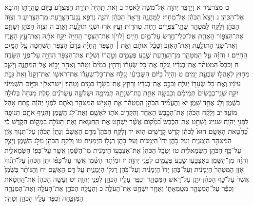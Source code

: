 \documentclass[twoside, openany, parskip=half, 11pt]{book}
\begin{document}
ט מצֹרעיד א וַיְדַבֵּ֥ר יְהֹוָ֖ה אֶל־מֹשֶׁ֥ה לֵּאמֹֽר׃ ב זֹ֤את תִּֽהְיֶה֙ תּוֹרַ֣ת הַמְּצֹרָ֔ע בְּי֖וֹם טׇהֳרָת֑וֹ וְהוּבָ֖א אֶל־הַכֹּהֵֽן׃ ג וְיָצָא֙ הַכֹּהֵ֔ן אֶל־מִח֖וּץ לַֽמַּחֲנֶ֑ה וְרָאָה֙ הַכֹּהֵ֔ן וְהִנֵּ֛ה נִרְפָּ֥א נֶֽגַע־הַצָּרַ֖עַת מִן־הַצָּרֽוּעַ׃ ד וְצִוָּה֙ הַכֹּהֵ֔ן וְלָקַ֧ח לַמִּטַּהֵ֛ר שְׁתֵּֽי־צִפֳּרִ֥ים חַיּ֖וֹת טְהֹר֑וֹת וְעֵ֣ץ אֶ֔רֶז וּשְׁנִ֥י תוֹלַ֖עַת וְאֵזֹֽב׃ ה וְצִוָּה֙ הַכֹּהֵ֔ן וְשָׁחַ֖ט אֶת־הַצִּפּ֣וֹר הָאֶחָ֑ת אֶל־כְּלִי־חֶ֖רֶשׂ עַל־מַ֥יִם חַיִּֽים׃ [לוי]ו אֶת־הַצִּפֹּ֤ר הַֽחַיָּה֙ יִקַּ֣ח אֹתָ֔הּ וְאֶת־עֵ֥ץ הָאֶ֛רֶז וְאֶת־שְׁנִ֥י הַתּוֹלַ֖עַת וְאֶת־הָאֵזֹ֑ב וְטָבַ֨ל אוֹתָ֜ם וְאֵ֣ת ׀ הַצִּפֹּ֣ר הַֽחַיָּ֗ה בְּדַם֙ הַצִּפֹּ֣ר הַשְּׁחֻטָ֔ה עַ֖ל הַמַּ֥יִם הַֽחַיִּֽים׃ ז וְהִזָּ֗ה עַ֧ל הַמִּטַּהֵ֛ר מִן־הַצָּרַ֖עַת שֶׁ֣בַע פְּעָמִ֑ים וְטִ֣הֲר֔וֹ וְשִׁלַּ֛ח אֶת־הַצִּפֹּ֥ר הַֽחַיָּ֖ה עַל־פְּנֵ֥י הַשָּׂדֶֽה׃ ח וְכִבֶּס֩ הַמִּטַּהֵ֨ר אֶת־בְּגָדָ֜יו וְגִלַּ֣ח אֶת־כׇּל־שְׂעָר֗וֹ וְרָחַ֤ץ בַּמַּ֙יִם֙ וְטָהֵ֔ר וְאַחַ֖ר יָב֣וֹא אֶל־הַֽמַּחֲנֶ֑ה וְיָשַׁ֛ב מִח֥וּץ לְאׇהֳל֖וֹ שִׁבְעַ֥ת יָמִֽים׃ ט וְהָיָה֩ בַיּ֨וֹם הַשְּׁבִיעִ֜י יְגַלַּ֣ח אֶת־כׇּל־שְׂעָר֗וֹ אֶת־רֹאשׁ֤וֹ וְאֶת־זְקָנוֹ֙ וְאֵת֙ גַּבֹּ֣ת עֵינָ֔יו וְאֶת־כָּל־שְׂעָר֖וֹ יְגַלֵּ֑חַ וְכִבֶּ֣ס אֶת־בְּגָדָ֗יו וְרָחַ֧ץ אֶת־בְּשָׂר֛וֹ בַּמַּ֖יִם וְטָהֵֽר׃ [ישראל]י וּבַיּ֣וֹם הַשְּׁמִינִ֗י יִקַּ֤ח שְׁנֵֽי־כְבָשִׂים֙ תְּמִימִ֔ם וְכַבְשָׂ֥ה אַחַ֛ת בַּת־שְׁנָתָ֖הּ תְּמִימָ֑ה וּשְׁלֹשָׁ֣ה עֶשְׂרֹנִ֗ים סֹ֤לֶת מִנְחָה֙ בְּלוּלָ֣ה בַשֶּׁ֔מֶן וְלֹ֥ג אֶחָ֖ד שָֽׁמֶן׃ יא וְהֶעֱמִ֞יד הַכֹּהֵ֣ן הַֽמְטַהֵ֗ר אֵ֛ת הָאִ֥ישׁ הַמִּטַּהֵ֖ר וְאֹתָ֑ם לִפְנֵ֣י יְהֹוָ֔ה פֶּ֖תַח אֹ֥הֶל מוֹעֵֽד׃ יב וְלָקַ֨ח הַכֹּהֵ֜ן אֶת־הַכֶּ֣בֶשׂ הָאֶחָ֗ד וְהִקְרִ֥יב אֹת֛וֹ לְאָשָׁ֖ם וְאֶת־לֹ֣ג הַשָּׁ֑מֶן וְהֵנִ֥יף אֹתָ֛ם תְּנוּפָ֖ה לִפְנֵ֥י יְהֹוָֽה׃ שנייג וְשָׁחַ֣ט אֶת־הַכֶּ֗בֶשׂ בִּ֠מְק֠וֹם אֲשֶׁ֨ר יִשְׁחַ֧ט אֶת־הַֽחַטָּ֛את וְאֶת־הָעֹלָ֖ה בִּמְק֣וֹם הַקֹּ֑דֶשׁ כִּ֡י כַּ֠חַטָּ֠את הָאָשָׁ֥ם הוּא֙ לַכֹּהֵ֔ן קֹ֥דֶשׁ קׇֽדָשִׁ֖ים הֽוּא׃ יד וְלָקַ֣ח הַכֹּהֵן֮ מִדַּ֣ם הָאָשָׁם֒ וְנָתַן֙ הַכֹּהֵ֔ן עַל־תְּנ֛וּךְ אֹ֥זֶן הַמִּטַּהֵ֖ר הַיְמָנִ֑ית וְעַל־בֹּ֤הֶן יָדוֹ֙ הַיְמָנִ֔ית וְעַל־בֹּ֥הֶן רַגְל֖וֹ הַיְמָנִֽית׃ טו וְלָקַ֥ח הַכֹּהֵ֖ן מִלֹּ֣ג הַשָּׁ֑מֶן וְיָצַ֛ק עַל־כַּ֥ף הַכֹּהֵ֖ן הַשְּׂמָאלִֽית׃ טז וְטָבַ֤ל הַכֹּהֵן֙ אֶת־אֶצְבָּע֣וֹ הַיְמָנִ֔ית מִן־הַשֶּׁ֕מֶן אֲשֶׁ֥ר עַל־כַּפּ֖וֹ הַשְּׂמָאלִ֑ית וְהִזָּ֨ה מִן־הַשֶּׁ֧מֶן בְּאֶצְבָּע֛וֹ שֶׁ֥בַע פְּעָמִ֖ים לִפְנֵ֥י יְהֹוָֽה׃ יז וּמִיֶּ֨תֶר הַשֶּׁ֜מֶן אֲשֶׁ֣ר עַל־כַּפּ֗וֹ יִתֵּ֤ן הַכֹּהֵן֙ עַל־תְּנ֞וּךְ אֹ֤זֶן הַמִּטַּהֵר֙ הַיְמָנִ֔ית וְעַל־בֹּ֤הֶן יָדוֹ֙ הַיְמָנִ֔ית וְעַל־בֹּ֥הֶן רַגְל֖וֹ הַיְמָנִ֑ית עַ֖ל דַּ֥ם הָאָשָֽׁם׃ יח וְהַנּוֹתָ֗ר בַּשֶּׁ֙מֶן֙ אֲשֶׁר֙ עַל־כַּ֣ף הַכֹּהֵ֔ן יִתֵּ֖ן עַל־רֹ֣אשׁ הַמִּטַּהֵ֑ר וְכִפֶּ֥ר עָלָ֛יו הַכֹּהֵ֖ן לִפְנֵ֥י יְהֹוָֽה׃ יט וְעָשָׂ֤ה הַכֹּהֵן֙ אֶת־הַ֣חַטָּ֔את וְכִפֶּ֕ר עַל־הַמִּטַּהֵ֖ר מִטֻּמְאָת֑וֹ וְאַחַ֖ר יִשְׁחַ֥ט אֶת־הָעֹלָֽה׃ כ וְהֶעֱלָ֧ה הַכֹּהֵ֛ן אֶת־הָעֹלָ֥ה וְאֶת־הַמִּנְחָ֖ה הַמִּזְבֵּ֑חָה וְכִפֶּ֥ר עָלָ֛יו הַכֹּהֵ֖ן וְטָהֵֽר׃
\end{document}

